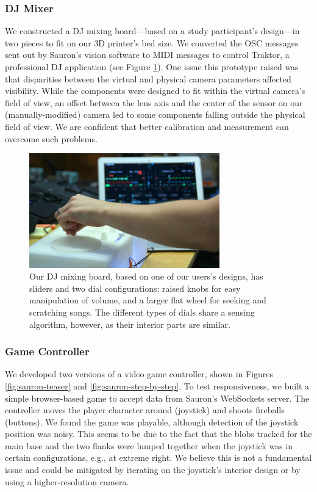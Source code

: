         \subsubsection{DJ Mixer}
        We constructed a DJ mixing board---based on a study participant's design---in two pieces to fit on our 3D printer's bed size. We converted the OSC messages sent out by Sauron's vision software to MIDI messages to control Traktor, a professional DJ application (see Figure \ref{fig:sauron-djmixer}). One issue this prototype raised was that disparities between the virtual and physical camera parameters affected visibility. While the components were designed to fit within the virtual camera's field of view, an offset between the lens axis and the center of the sensor on our (manually-modified) camera led to some components falling outside the physical field of view. We are confident that better calibration and measurement can overcome such problems.
        
        \begin{figure}
\centering
\includegraphics[width=3.25in]{figures/sauron/DJ-controller-action.JPG}
\caption{Our DJ mixing board, based on one of our users's designs, has sliders and two dial configurations: raised knobs for easy manipulation of volume, and a larger flat wheel for seeking and scratching songs.  The different types of dials share a sensing algorithm, however, as their interior parts are similar.}
\label{fig:sauron-djmixer}
\end{figure}
        
        \subsubsection{Game Controller}
        We developed two versions of a video game controller, shown in Figures \ref{fig:sauron-teaser} and \ref{fig:sauron-step-by-step}. To test responsiveness, we built a simple browser-based game to accept data from Sauron's WebSockets server. The controller moves the player character around (joystick) and shoots fireballs (buttons). We found the game was playable, although detection of the joystick position was noisy. This seems to be due to the fact that the blobs tracked for the main base and the two flanks were lumped together when the joystick was in certain configurations, e.g., at extreme right. We believe this is not a fundamental issue and could be mitigated by iterating on the joystick's interior design or by using a higher-resolution camera.

